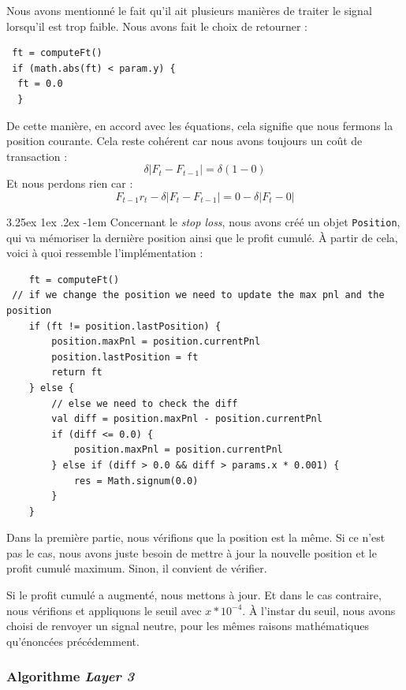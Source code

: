 \documentclass[a4paper, 11pt]{article}
\makeatletter
\renewcommand\paragraph{\@startsection{paragraph}{5}{\z@}%
  {3.25ex \@plus1ex \@minus.2ex}%
  {-1em}%
  {\normalfont\normalsize\bfseries}}
\makeatother
\begin{document}
Nous avons mentionné le fait qu'il ait plusieurs manières de traiter le signal lorsqu'il est trop faible. Nous avons fait le choix de
retourner :
\begin{lstlisting}
 ft = computeFt()
 if (math.abs(ft) < param.y) {
  ft = 0.0
  }
\end{lstlisting}
De cette manière, en accord avec les équations, cela signifie que nous fermons la position courante. Cela reste cohérent car nous avons
toujours un coût de transaction :
$$ \delta |F_t - F_{t-1}| = \delta (1 - 0)$$
Et nous perdons rien car :
$$ F_{t-1} r_t - \delta | F_t - F_{t-1}| = 0 - \delta | F_t - 0 |$$

\paragraph{}
Concernant le \textit{stop loss}, nous avons créé un objet \texttt{Position}, qui va mémoriser la dernière position ainsi que le profit
cumulé. À partir de cela, voici à quoi ressemble l'implémentation :
\begin{lstlisting}
    ft = computeFt()
 // if we change the position we need to update the max pnl and the position
    if (ft != position.lastPosition) {
        position.maxPnl = position.currentPnl
        position.lastPosition = ft
        return ft
    } else {
        // else we need to check the diff
        val diff = position.maxPnl - position.currentPnl
        if (diff <= 0.0) {
            position.maxPnl = position.currentPnl
        } else if (diff > 0.0 && diff > params.x * 0.001) {
            res = Math.signum(0.0)
        }
    }
\end{lstlisting}

Dans la première partie, nous vérifions que la position est la même. Si ce n'est pas le cas, nous avons juste besoin de mettre à jour la nouvelle
position et le profit cumulé maximum. Sinon, il convient de vérifier.

Si le profit cumulé a augmenté, nous mettons à jour. Et dans le cas contraire, nous vérifions et appliquons le seuil avec $x * 10^{-4}$.
À l'instar du seuil, nous avons choisi de renvoyer un signal neutre, pour les mêmes raisons mathématiques qu'énoncées précédemment.

\subsubsection{Algorithme \textit{Layer 3}}
\end{document}
